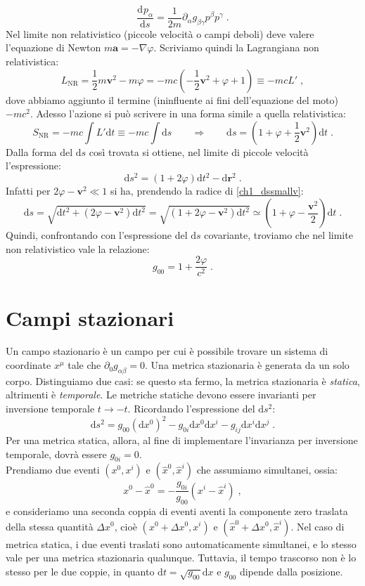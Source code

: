 \documentclass[12pt,a4paper]{report}
\theoremstyle{definition}
\newcommand{\dev}[3][]{\frac{\mathrm{d}^{#1} #2}{\mathrm{d} #3^{#1}}}
\newcommand{\diff}[1][]{\mathrm{d}#1}
\begin{document}
\begin{equation}
\dev{p_{\alpha}}{s}=\frac{1}{2m}\partial_{\alpha}g_{\beta\gamma}p^{\beta}p^{\gamma}\;.
\end{equation}
Nel limite non relativistico (piccole velocità o campi deboli) deve valere l'equazione di Newton $m\mathbf{a}=-\nabla\varphi$. Scriviamo quindi la Lagrangiana non relativistica:
\begin{equation}
L_{\mathrm{NR}}=\frac{1}{2}m\mathbf{v}^2-m\varphi=-mc\left(-\frac{1}{2}\mathbf{v}^2+\varphi+1\right)\equiv -mc L'\;,
\end{equation}
dove abbiamo aggiunto il termine (ininfluente ai fini dell'equazione del moto) $-mc^2$. Adesso l'azione si può scrivere in una forma simile a quella relativistica:
\begin{equation*}
S_{\mathrm{NR}}=-mc\int L'\diff{t}\equiv -mc\int\diff{s}\qquad \Longrightarrow\qquad \diff{s}=\left(1+\varphi+\frac{1}{2}\mathbf{v}^2\right)\diff{t}\;.
\end{equation*}
Dalla forma del $\diff{s}$ così trovata si ottiene, nel limite di piccole velocità l'espressione:
\begin{equation}
\diff{s^2}=(1+2\varphi)\diff{t}^2-\diff{\mathbf{r}}^2\;. \label{ch1_dssmallv}
\end{equation}
Infatti per $2\varphi-\mathbf{v}^2\ll 1$ si ha, prendendo la radice di \eqref{ch1_dssmallv}:
$$
\diff{s}=\sqrt{\diff{t}^2+(2\varphi-\mathbf{v}^2)\diff{t}^2}=\sqrt{(1+2\varphi-\mathbf{v}^2)\diff{t}^2}\simeq \left(1+\varphi-\frac{\mathbf{v}^2}{2}\right)\diff{t}\;.
$$
Quindi, confrontando con l'espressione del $\diff{s}$ covariante, troviamo che nel limite non relativistico vale la relazione:
\begin{equation}
g_{00}=1+\frac{2\varphi}{c^2}\;.
\end{equation}
\chapter{Campi stazionari}
Un campo stazionario è un campo per cui è possibile trovare un sistema di coordinate $x^{\mu}$ tale che $\partial_{0}g_{\alpha\beta}=0$. Una metrica stazionaria è generata da un solo corpo. Distinguiamo due casi: se questo sta fermo, la metrica stazionaria è \emph{statica}, altrimenti è \emph{temporale}. Le metriche statiche devono essere invarianti per inversione temporale $t\to -t$. Ricordando l'espressione del $\diff{s^2}$:
$$
\diff{s^2}=g_{00}(\diff{x^0})^2-g_{0i}\diff{x^0}\diff{x^i}-g_{ij}\diff{x^i}\diff{x^j}\;.
$$
Per una metrica statica, allora, al fine di implementare l'invarianza per inversione temporale, dovrà essere $g_{0i}=0$. \\
Prendiamo due eventi $(x^0,x^i)$ e $(\hat{x}^0,\hat{x}^i)$ che assumiamo simultanei, ossia:
$$
x^0-\hat{x}^0=-\frac{g_{0i}}{g_{00}}(x^i-\hat{x}^i)\;,
$$
e consideriamo una seconda coppia di eventi aventi la componente zero traslata della stessa quantità $\Delta x^0$, cioè $(x^0+\Delta x^0,x^i)$ e $(\hat{x}^0+\Delta x^0,\hat{x}^i)$. Nel caso di metrica statica, i due eventi traslati sono automaticamente simultanei, e lo stesso vale per una metrica stazionaria qualunque. Tuttavia, il tempo trascorso non è lo stesso per le due coppie, in quanto $\diff{t}=\sqrt{g_{00}}\diff{x}$ e $g_{00}$ dipende dalla posizione.
\end{document}
